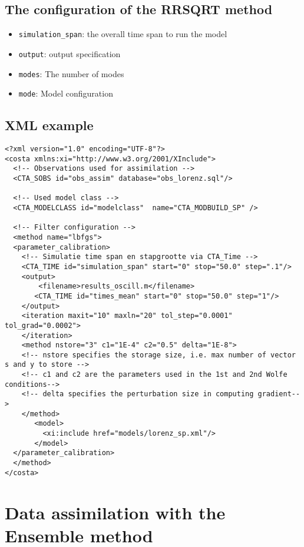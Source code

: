 
\subsection{The configuration of the RRSQRT method}
\begin{itemize}
\item {\tt simulation\_span}: the overall time span to run the model
\item {\tt output}: output specification
\item {\tt modes}: The number of modes
\item {\tt mode}: Model configuration
\end{itemize}

\subsection{XML example}

\begin{verbatim}
<?xml version="1.0" encoding="UTF-8"?>
<costa xmlns:xi="http://www.w3.org/2001/XInclude">
  <!-- Observations used for assimilation -->
  <CTA_SOBS id="obs_assim" database="obs_lorenz.sql"/>

  <!-- Used model class -->
  <CTA_MODELCLASS id="modelclass"  name="CTA_MODBUILD_SP" />

  <!-- Filter configuration -->
  <method name="lbfgs">
  <parameter_calibration>
    <!-- Simulatie time span en stapgrootte via CTA_Time -->
    <CTA_TIME id="simulation_span" start="0" stop="50.0" step=".1"/>
    <output>
        <filename>results_oscill.m</filename> 
       <CTA_TIME id="times_mean" start="0" stop="50.0" step="1"/>
    </output>
    <iteration maxit="10" maxln="20" tol_step="0.0001" tol_grad="0.0002">
    </iteration>
    <method nstore="3" c1="1E-4" c2="0.5" delta="1E-8">
    <!-- nstore specifies the storage size, i.e. max number of vector s and y to store -->
    <!-- c1 and c2 are the parameters used in the 1st and 2nd Wolfe conditions-->
    <!-- delta specifies the perturbation size in computing gradient-->
    </method>
       <model>
         <xi:include href="models/lorenz_sp.xml"/>
       </model>
  </parameter_calibration>
  </method>
</costa>
\end{verbatim}


\section{Data assimilation  with the Ensemble method}

